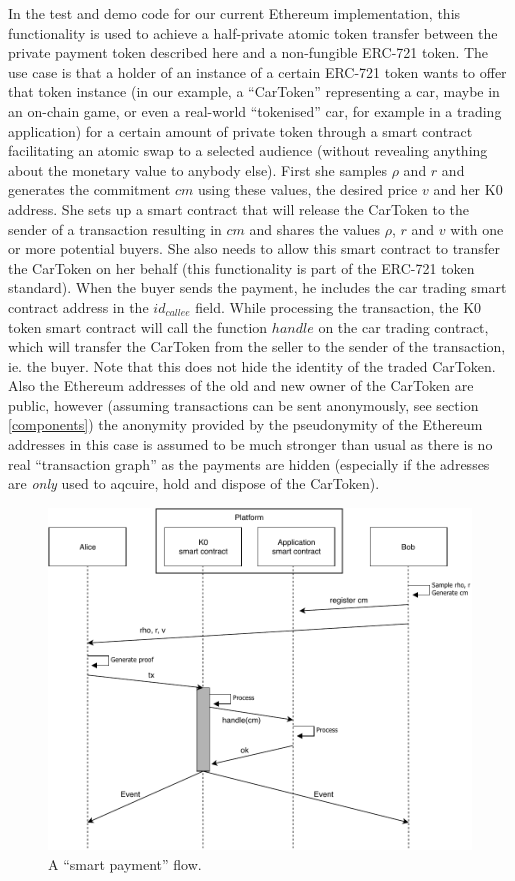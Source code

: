 \documentclass{article}
\begin{document}
In the test and demo code for our current Ethereum implementation, this functionality is used to achieve a half-private atomic token transfer between the private payment token described here and a non-fungible ERC-721 token. The use case is that a holder of an instance of a certain ERC-721 token wants to offer that token instance (in our example, a ``CarToken'' representing a car, maybe in an on-chain game, or even a real-world ``tokenised'' car, for example in a trading application) for a certain amount of private token through a smart contract facilitating an atomic swap to a selected audience (without revealing anything about the monetary value to anybody else). First she samples $\rho$ and $r$ and generates the commitment $cm$ using these values, the desired price $v$ and her K0 address. She sets up a smart contract that will release the CarToken to the sender of a transaction resulting in $cm$ and shares the values $\rho$, $r$ and $v$ with one or more potential buyers. She also needs to allow this smart contract to transfer the CarToken on her behalf (this functionality is part of the ERC-721 token standard). When the buyer sends the payment, he includes the car trading smart contract address in the $id_{callee}$ field. While processing the transaction, the K0 token smart contract will call the function $handle$ on the car trading contract, which will transfer the CarToken from the seller to the  sender of the transaction, ie. the buyer. Note that this does not hide the identity of the traded CarToken. Also the Ethereum addresses of the old and new owner of the CarToken are public, however (assuming transactions can be sent anonymously, see section \ref{components}) the anonymity provided by the pseudonymity of the Ethereum addresses in this case is assumed to be much stronger than usual as there is no real ``transaction graph'' as the payments are hidden (especially if the adresses are \textit{only} used to aqcuire, hold and dispose of the CarToken).
\begin{figure}
\centering
\includegraphics[width=\columnwidth]{smart_payment.pdf}
\caption{A ``smart payment'' flow.}
\end{figure}
\end{document}
